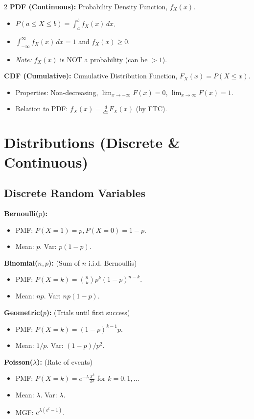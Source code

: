 \documentclass[10pt, letterpaper]{article}
\begin{document}
\begin{multicols*}{2}
\textbf{PDF (Continuous):} Probability Density Function, $f_X(x)$.
\begin{itemize}
    \item $P(a \le X \le b) = \int_a^b f_X(x) \, dx$.
    \item $\int_{-\infty}^{\infty} f_X(x) \, dx = 1$ and $f_X(x) \ge 0$.
    \item \textit{Note:} $f_X(x)$ is NOT a probability (can be $>1$).
\end{itemize}

\textbf{CDF (Cumulative):} Cumulative Distribution Function, $F_X(x) = P(X \le x)$.
\begin{itemize}
    \item Properties: Non-decreasing, $\lim_{x\to-\infty} F(x) = 0$, $\lim_{x\to\infty} F(x) = 1$.
    \item Relation to PDF: $f_X(x) = \frac{d}{dx}F_X(x)$ (by FTC).
\end{itemize}

\section{Distributions (Discrete \& Continuous)}
\subsection{Discrete Random Variables}
\textbf{Bernoulli($p$):}
\begin{itemize}
    \item PMF: $P(X=1)=p, P(X=0)=1-p$.
    \item Mean: $p$. Var: $p(1-p)$.
\end{itemize}

\textbf{Binomial($n, p$):} (Sum of $n$ i.i.d. Bernoullis)
\begin{itemize}
    \item PMF: $P(X=k) = \binom{n}{k} p^k (1-p)^{n-k}$.
    \item Mean: $np$. Var: $np(1-p)$.
\end{itemize}

\textbf{Geometric($p$):} (Trials until first success)
\begin{itemize}
    \item PMF: $P(X=k) = (1-p)^{k-1}p$.
    \item Mean: $1/p$. Var: $(1-p)/p^2$.
\end{itemize}

\textbf{Poisson($\lambda$):} (Rate of events)
\begin{itemize}
    \item PMF: $P(X=k) = e^{-\lambda} \frac{\lambda^k}{k!}$ for $k=0, 1, \dots$
    \item Mean: $\lambda$. Var: $\lambda$.
    \item MGF: $e^{\lambda(e^t - 1)}$.
\end{itemize}


\end{multicols*}
\end{document}
